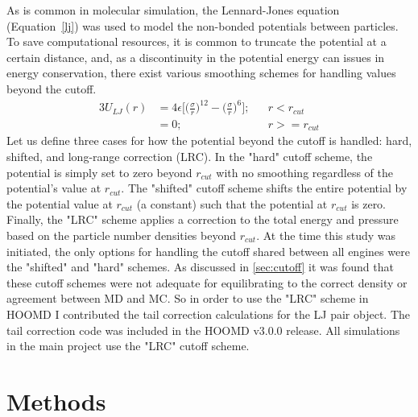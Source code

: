 As is common in molecular simulation, the Lennard-Jones equation (Equation~\eqref{lj}) was used to model the non-bonded potentials between particles.
To save computational resources, it is common to truncate the potential at a certain distance, and, as a discontinuity in the potential energy can issues in energy conservation, there exist various smoothing schemes for handling values beyond the cutoff.
\begin{alignat}{3}
U_{LJ}(r) & = 4\epsilon\bigg[\bigg(\frac{\sigma}{r}\bigg)^{12} - \bigg(\frac{\sigma}{r}\bigg)^{6}\bigg]; && r<r_{cut} 
    \label{lj} \\
& = 0; && r>=r_{cut}
    \nonumber
\end{alignat}
Let us define three cases for how the potential beyond the cutoff is handled: hard, shifted, and long-range correction (LRC). 
In the "hard" cutoff scheme, the potential is simply set to zero beyond $r_{cut}$ with no smoothing regardless of the potential’s value at $r_{cut}$.
The "shifted" cutoff scheme shifts the entire potential by the potential value at $r_{cut}$ (a constant) such that the potential at $r_{cut}$ is zero.
Finally, the "LRC" scheme applies a correction to the total energy and pressure based on the particle number densities beyond $r_{cut}$.
At the time this study was initiated, the only options for handling the cutoff shared between all engines were the "shifted" and "hard" schemes.
As discussed in \autoref{sec:cutoff} it was found that these cutoff schemes were not adequate for equilibrating to the correct density or agreement between MD and MC.
So in order to use the "LRC" scheme in HOOMD I contributed the tail correction calculations for the LJ pair object. 
The tail correction code was included in the HOOMD v3.0.0 release.
All simulations in the main project use the "LRC" cutoff scheme.

\section{Methods}

